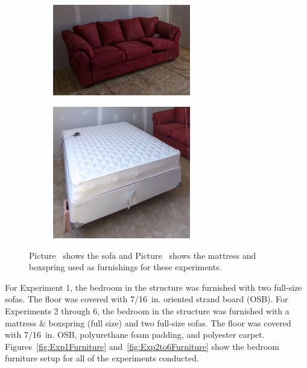 \documentclass[12pt,oneside]{book}
\begin{document}
\begin{figure}[ht]
  \centering
  \begin{subfigure}[Sofa]{0.5\linewidth}
    \centering\includegraphics[width=6cm]{Figures/Furniture/sofa.jpg}
    \caption{\label{fig:Sofa}}
  \end{subfigure}
  \begin{subfigure}[Bed]{0.5\linewidth}
    \centering\includegraphics[width=6cm]{Figures/Furniture/bed.jpg}
    \caption{\label{fig:Bed}}
  \end{subfigure}
  \caption{Picture~ shows the sofa and Picture~ shows the mattress and boxspring used as furnishings for these experiments.}
  \label{fig:FurnitureImages}
\end{figure}

For Experiment 1, the bedroom in the structure was furnished with two full-size sofas. The floor was covered with 7/16~in. oriented strand board (OSB). For Experiments 2 through 6, the bedroom in the structure was furnished with a mattress \& boxspring (full size) and two full-size sofas. The floor was covered with 7/16~in. OSB, polyurethane foam padding, and polyester carpet. Figures~\ref{fig:Exp1Furniture} and~\ref{fig:Exp2to6Furniture} show the bedroom furniture setup for all of the experiments conducted.
\end{document}
